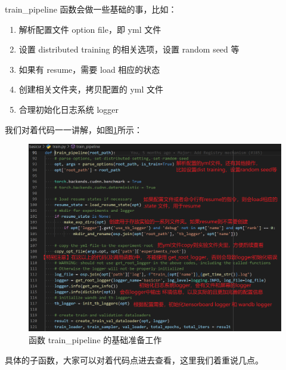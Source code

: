 \documentclass[../main.tex]{subfiles}
\begin{document}
train\_pipeline 函数会做一些基础的事，比如：
\begin{enumerate}
    \item 解析配置文件 option file，即 yml 文件
    \item 设置 distributed training 的相关选项，设置 random seed 等
    \item 如果有 resume，需要 load 相应的状态
    \item 创建相关文件夹，拷贝配置的 yml 文件
    \item 合理初始化日志系统 logger
\end{enumerate}

我们对着代码一一讲解，如图\ref{fig:getting_start_train_pipeline}所示：

\begin{figure}[ht]
    \begin{center}
        \vspace{-0.2cm}
        \includegraphics[width=0.85\linewidth]{figures/getting_start_train_pipeline.png}
        \vspace{-0.3cm}
        \caption{函数 train\_pipeline 的基础准备工作}
        \label{fig:getting_start_train_pipeline}
    \end{center}
    \vspace{-0.5cm}
\end{figure}

具体的子函数，大家可以对着代码点进去查看，这里我们着重说几点。
\end{document}
